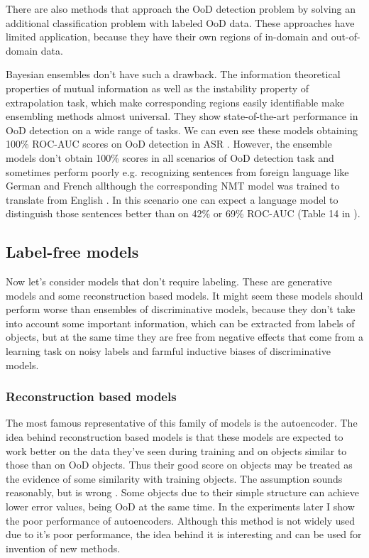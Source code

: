 \documentclass{article}
\begin{document}
    There are also methods that approach the OoD detection problem by solving an additional classification problem with labeled OoD data. These approaches have limited application, because they have their own regions of in-domain and out-of-domain data.

    Bayesian ensembles don't have such a drawback. The information theoretical properties of mutual information as well as the instability property of extrapolation task, which make corresponding regions easily identifiable make ensembling methods almost universal. They show state-of-the-art performance in OoD detection on a wide range of tasks. We can even see these models obtaining 100\% ROC-AUC scores on OoD detection in ASR \cite{structured_prediction}. However, the ensemble models don't obtain 100\% scores in all scenarios of OoD detection task and sometimes perform poorly e.g. recognizing sentences from foreign language like German and French allthough the corresponding NMT model was trained to translate from English \cite{structured_prediction}. In this scenario one can expect a language model to distinguish those sentences better than on 42\% or 69\% ROC-AUC (Table 14 in \cite{structured_prediction}).

\subsection{Label-free models}
    Now let's consider models that don't require labeling. These are generative models and some reconstruction based models. It might seem these models should perform worse than ensembles of discriminative models, because they don't take into account some important information, which can be extracted from labels of objects, but at the same time they are free from negative effects that come from a learning task on noisy labels and farmful inductive biases of discriminative models.

\subsubsection{Reconstruction based models}
    The most famous representative of this family of models is the autoencoder. The idea behind reconstruction based models is that these models are expected to work better on the data they've seen during training and on objects similar to those than on OoD objects. Thus their good score on objects may be treated as the evidence of some similarity with training objects. The assumption sounds reasonably, but is wrong \cite{autoencoders}. Some objects due to their simple structure can achieve lower error values, being OoD at the same time. In the experiments later I show the poor performance of autoencoders. Although this method is not widely used due to it's poor performance, the idea behind it is interesting and can be used for invention of new methods.
\end{document}
